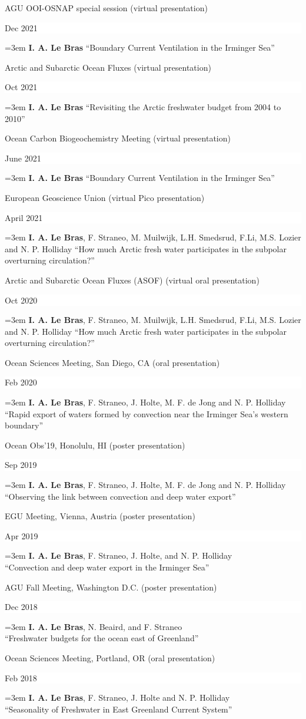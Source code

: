 \documentclass[paper=letter,fontsize=11pt]{scrartcl} %
\newcommand{\sepspace}{\vspace*{3mm}}		%
\newcommand{\ConfEntry}[5]{
		\noindent #1 (#2) \hfill      %
		\colorbox{White}{%
			\parbox{6em}{%
			\hfill\color{Black}#3}} \par %
		\noindent \hangindent=3em\hangafter=0 #4 ``#5'' \sepspace}
\begin{document}
\ConfEntry{AGU OOI-OSNAP special session}{virtual presentation}{Dec 2021}{\textbf{I. A. Le Bras}}{Boundary Current Ventilation in the Irminger Sea}

\ConfEntry{Arctic and Subarctic Ocean Fluxes}{virtual presentation}{Oct 2021}{\textbf{I. A. Le Bras}}{Revisiting the Arctic freshwater budget from 2004 to 2010}

\ConfEntry{Ocean Carbon Biogeochemistry Meeting}{virtual presentation}{June 2021}{\textbf{I. A. Le Bras}}{Boundary Current Ventilation in the Irminger Sea}

\ConfEntry{European Geoscience Union}{virtual Pico presentation}{April 2021}{\textbf{I. A. Le Bras}, F. Straneo, M. Muilwijk, L.H. Smedsrud, F.Li, M.S. Lozier and N. P. Holliday}{How much Arctic fresh water participates in the subpolar overturning circulation?}

\ConfEntry{Arctic and Subarctic Ocean Fluxes (ASOF)}{virtual oral presentation}{Oct 2020}{\textbf{I. A. Le Bras}, F. Straneo, M. Muilwijk, L.H. Smedsrud, F.Li, M.S. Lozier and N. P. Holliday}{How much Arctic fresh water participates in the subpolar overturning circulation?}

\ConfEntry{Ocean Sciences Meeting, San Diego, CA}{oral presentation}{Feb 2020}{\textbf{I. A. Le Bras}, F. Straneo, J. Holte, M. F. de Jong and N. P. Holliday\\}{Rapid export of waters formed by convection near the Irminger Sea's western boundary}


\ConfEntry{Ocean Obs'19, Honolulu, HI}{poster presentation}{Sep 2019}{\textbf{I. A. Le Bras}, F. Straneo, J. Holte, M. F. de Jong and N. P. Holliday\\}{Observing the link between convection and deep water export}

\ConfEntry{EGU Meeting, Vienna, Austria}{poster presentation}{Apr 2019}{\textbf{I. A. Le Bras}, F. Straneo, J. Holte, and N. P. Holliday\\}{Convection and deep water export in the Irminger Sea}

\ConfEntry{AGU Fall Meeting, Washington D.C.}{poster presentation}{Dec 2018}{\textbf{I. A. Le Bras}, N. Beaird, and F. Straneo\\}{Freshwater budgets for the ocean east of Greenland}

\ConfEntry{Ocean Sciences Meeting, Portland, OR}{oral presentation}{Feb 2018}{\textbf{I. A. Le Bras}, F. Straneo, J. Holte and N. P. Holliday\\}{Seasonality of Freshwater in East Greenland Current System}
\end{document}
